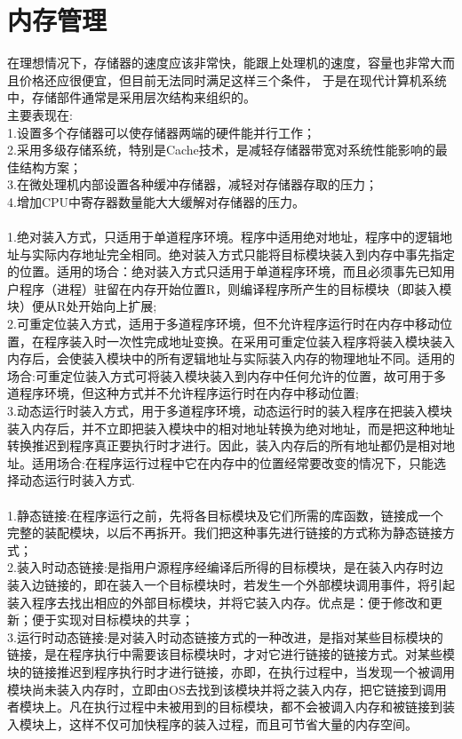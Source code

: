 \documentclass[UTF8]{article}
\begin{document}
    \section*{内存管理}
    在理想情况下，存储器的速度应该非常快，能跟上处理机的速度，容量也非常大而且价格还应很便宜，但目前无法同时满足这样三个条件， 于是在现代计算机系统中，存储部件通常是采用层次结构来组织的。\\
    主要表现在:\\
    1.设置多个存储器可以使存储器两端的硬件能并行工作；\\
    2.采用多级存储系统，特别是Cache技术，是减轻存储器带宽对系统性能影响的最佳结构方案；\\
    3.在微处理机内部设置各种缓冲存储器，减轻对存储器存取的压力；\\
    4.增加CPU中寄存器数量能大大缓解对存储器的压力。\\
    \\
    1.绝对装入方式，只适用于单道程序环境。程序中适用绝对地址，程序中的逻辑地址与实际内存地址完全相同。绝对装入方式只能将目标模块装入到内存中事先指定的位置。适用的场合：绝对装入方式只适用于单道程序环境，而且必须事先已知用户程序（进程）驻留在内存开始位置R，则编译程序所产生的目标模块（即装入模块）便从R处开始向上扩展;\\
    2.可重定位装入方式，适用于多道程序环境，但不允许程序运行时在内存中移动位置，在程序装入时一次性完成地址变换。在采用可重定位装入程序将装入模块装入内存后，会使装入模块中的所有逻辑地址与实际装入内存的物理地址不同。适用的场合:可重定位装入方式可将装入模块装入到内存中任何允许的位置，故可用于多道程序环境，但这种方式并不允许程序运行时在内存中移动位置;\\
    3.动态运行时装入方式，用于多道程序环境，动态运行时的装入程序在把装入模块装入内存后，并不立即把装入模块中的相对地址转换为绝对地址，而是把这种地址转换推迟到程序真正要执行时才进行。因此，装入内存后的所有地址都仍是相对地址。适用场合:在程序运行过程中它在内存中的位置经常要改变的情况下，只能选择动态运行时装入方式.\\
    \\
    1.静态链接:在程序运行之前，先将各目标模块及它们所需的库函数，链接成一个完整的装配模块，以后不再拆开。我们把这种事先进行链接的方式称为静态链接方式；\\
    2.装入时动态链接:是指用户源程序经编译后所得的目标模块，是在装入内存时边装入边链接的，即在装入一个目标模块时，若发生一个外部模块调用事件，将引起装入程序去找出相应的外部目标模块，并将它装入内存。优点是：便于修改和更新；便于实现对目标模块的共享；\\
    3.运行时动态链接:是对装入时动态链接方式的一种改进，是指对某些目标模块的链接，是在程序执行中需要该目标模块时，才对它进行链接的链接方式。对某些模块的链接推迟到程序执行时才进行链接，亦即，在执行过程中，当发现一个被调用模块尚未装入内存时，立即由OS去找到该模块并将之装入内存，把它链接到调用者模块上。凡在执行过程中未被用到的目标模块，都不会被调入内存和被链接到装入模块上，这样不仅可加快程序的装入过程，而且可节省大量的内存空间。\\
\end{document}
